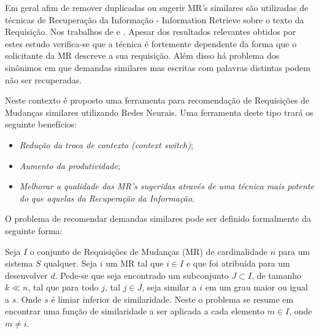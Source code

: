 \documentclass[msc,proposal,hidelot,hideabstract]{ppgccufmg} %
\begin{document}
Em geral afim de remover duplicadas ou sugerir MR's similares são utilizadas de
técnicas de Recuperação da Informação - Information Retrieve
\cite{baeza1999modern} sobre o texto da Requisição. Nos trabalhos de
\cite{101186} e \cite{Runeson:2007:DDD:1248820.1248882}. Apesar dos resultados
relevantes obtidos por estes estudo verifica-se que a técnica é fortemente
dependente da forma que o solicitante da MR descreve a sua requisição. Além disso
há problema dos sinônimos em que demandas similares mas escritas com palavras
distintas podem não ser recuperadas.


Neste contexto é proposto uma ferramenta para recomendação de Requisições de
Mudanças similares utilizando Redes Neurais. Uma ferramenta deste tipo trará os
seguinte benefícios:

\begin{itemize}
\item \textit{Redução da troca de contexto (context switch)};
\item \textit{Aumento da produtividade};
\item \textit{Melhorar a qualidade das MR's sugeridas através de uma técnica mais
  potente do que aquelas da Recuperação da Informação}.
\end{itemize}

O problema de recomendar demandas similares pode ser definido formalmente da
seguinte forma:

Seja $I$ o conjunto de Requisições de Mudanças (MR) de cardinalidade $n$ para um
sistema $S$ qualquer. Seja $i$ um MR tal que $i \in I$ e que foi atribuída para um desenvolver
$d$. Pede-se que seja encontrado um subconjunto $J \subset I$, de tamanho $k \ll n$, tal
que para todo $j$, tal $j \in J$, seja similar a $i$ em um grau maior ou igual a
$s$. Onde $s$ é limiar inferior de similaridade. Neste o problema se resume em
encontrar uma função de similaridade a ser aplicada a cada elemento $m \in I$,
onde $m \neq i$.
\end{document}
